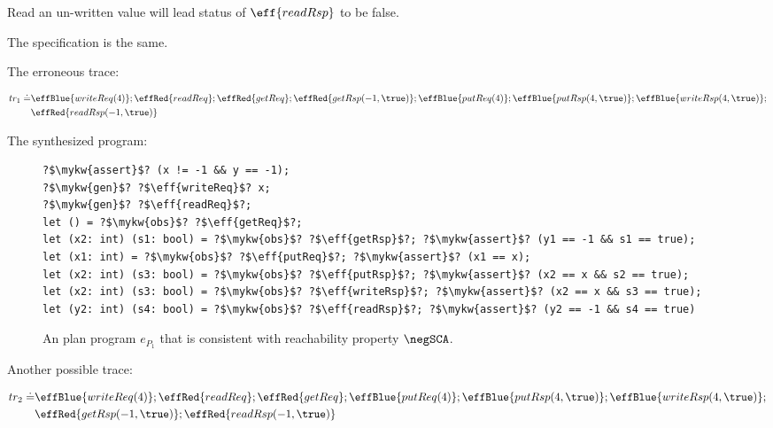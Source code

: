 Read an un-written value will lead status of $\eff{readRsp}$ to be false.

The specification is the same.

The erroneous trace:

{\small\begin{align*}
tr_1 \doteq 
&\effBlue{writeReq(4)};\effRed{readReq};\effRed{getReq};\effRed{getRsp(-1,\true)};\effBlue{putReq(4)};\effBlue{putRsp(4,\true)};\effBlue{writeRsp(4,\true)};
\\&\effRed{readRsp(-1,\true)}
\end{align*}}\noindent


The synthesized program:

\begin{figure}
    \centering
\begin{verbatim}
?$\mykw{assert}$? (x != -1 && y == -1); 
?$\mykw{gen}$? ?$\eff{writeReq}$? x;
?$\mykw{gen}$? ?$\eff{readReq}$?;
let () = ?$\mykw{obs}$? ?$\eff{getReq}$?;
let (x2: int) (s1: bool) = ?$\mykw{obs}$? ?$\eff{getRsp}$?; ?$\mykw{assert}$? (y1 == -1 && s1 == true);
let (x1: int) = ?$\mykw{obs}$? ?$\eff{putReq}$?; ?$\mykw{assert}$? (x1 == x);
let (x2: int) (s3: bool) = ?$\mykw{obs}$? ?$\eff{putRsp}$?; ?$\mykw{assert}$? (x2 == x && s2 == true);
let (x2: int) (s3: bool) = ?$\mykw{obs}$? ?$\eff{writeRsp}$?; ?$\mykw{assert}$? (x2 == x && s3 == true);
let (y2: int) (s4: bool) = ?$\mykw{obs}$? ?$\eff{readRsp}$?; ?$\mykw{assert}$? (y2 == -1 && s4 == true)
\end{verbatim}
    \caption{An plan program $e_{P_1}$ that is consistent with reachability property $\negSCA$. }
    \label{fig:2pc-term}
\end{figure}

Another possible trace:

{\small\begin{align*}
tr_2 \doteq 
&\effBlue{writeReq(4)};\effRed{readReq};\effRed{getReq};\effBlue{putReq(4)};\effBlue{putRsp(4,\true)};\effBlue{writeRsp(4,\true)};
\\&\effRed{getRsp(-1,\true)};\effRed{readRsp(-1,\true)}
\end{align*}}\noindent

